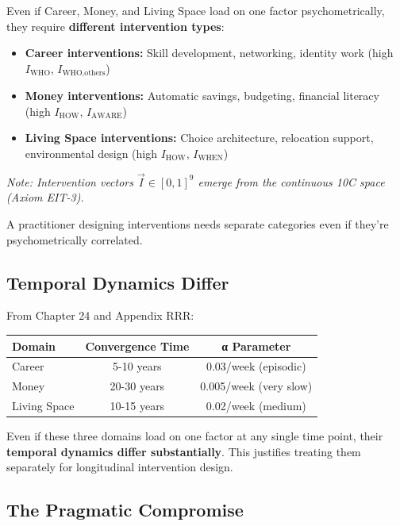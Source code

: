 \begin{tcolorbox}[colback=green!5!white, colframe=green!75!black, title=Practitioner Argument]
Even if Career, Money, and Living Space load on one factor psychometrically, they require \textbf{different intervention types}:

\begin{itemize}[nosep]
\item \textbf{Career interventions:} Skill development, networking, identity work (high $I_{\text{WHO}}$, $I_{\text{WHO},\text{others}}$)
\item \textbf{Money interventions:} Automatic savings, budgeting, financial literacy (high $I_{\text{HOW}}$, $I_{\text{AWARE}}$)
\item \textbf{Living Space interventions:} Choice architecture, relocation support, environmental design (high $I_{\text{HOW}}$, $I_{\text{WHEN}}$)
\end{itemize}
\noindent\textit{Note: Intervention vectors $\vec{I} \in [0,1]^9$ emerge from the continuous 10C space (Axiom EIT-3).}

A practitioner designing interventions needs separate categories even if they're psychometrically correlated.
\end{tcolorbox}

\subsection{Temporal Dynamics Differ}

From Chapter 24 and Appendix RRR:

\begin{center}
\begin{tabular}{@{}lcc@{}}
\toprule
\textbf{Domain} & \textbf{Convergence Time} & \textbf{α Parameter} \\
\midrule
Career & 5-10 years & 0.03/week (episodic) \\
Money & 20-30 years & 0.005/week (very slow) \\
Living Space & 10-15 years & 0.02/week (medium) \\
\bottomrule
\end{tabular}
\end{center}

Even if these three domains load on one factor at any single time point, their \textbf{temporal dynamics differ substantially}. This justifies treating them separately for longitudinal intervention design.

\subsection{The Pragmatic Compromise}

